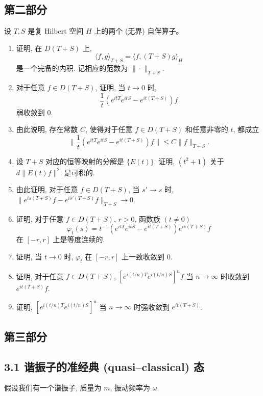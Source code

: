 \subsection*{第二部分}

设 $T, S$ 是复 Hilbert 空间 $H$ 上的两个 (无界) 自伴算子。

\begin{enumerate}
    \item 证明, 在 $D(T + S)$ 上, \[\langle f, g \rangle_{T+S} 
    = \langle f, (T + S)g \rangle_H\] 是一个完备的内积. 
    记相应的范数为 $\| \cdot \|_{T+S}$.
    \item 对于任意 $f \in D(T + S)$, 证明, 当 $t \to 0$ 时, 
    \[\frac{1}{t} (e^{itT} e^{itS} - e^{it(T+S)}) f\] 弱收敛到 $0$.
    \item 由此说明, 存在常数 $C$, 使得对于任意 $f \in D(T + S)$ 和任意非零的 $t$, 都成立 
    \[\|\frac{1}{t} (e^{itT} e^{itS} - e^{it(T+S)}) f \| \leqslant C \| f \|_{T+S}.\]
    \item 设 $T + S$ 对应的恒等映射的分解是 $\{E(t)\}$. 
    证明, $(t^2 + 1)$ 关于 $d\|E(t) f \|^2$ 是可积的.
    \item 由此证明, 对于任意 $f \in D(T+S)$, 当 $s' \to s$ 时, 
    $\| e^{is(T+S)} f - e^{is'(T+S)} f \|_{T+S} \to 0$.
    \item 证明, 对于任意 $f \in D(T + S)$, $r > 0$, 函数族 $(t \neq 0)$ 
    \[\varphi_t(s) = t^{-1}(e^{itT} e^{itS} - e^{it(T+S)}) e^{is(T+S)} f\]
    在 $[-r, r]$ 上是等度连续的.
    \item 证明, 当 $t \to 0$ 时, $\varphi_t$ 在 $[-r, r]$ 上一致收敛到 $0$.
    \item 证明, 对于任意 $f \in D(T+S)$, $[e^{i(t/n)T} e^{i(t/n)S}]^n f$ 
    当 $n \to \infty$ 时收敛到 $e^{it(T+S)} f$.
    \item 证明, $[e^{i(t/n)T} e^{i(t/n)S}]^n$ 当 $n \to \infty$ 时强收敛到 $e^{it(T+S)}$.
\end{enumerate}

\subsection*{第三部分}

\subsection*{3.1 谐振子的准经典 (quasi--classical) 态}

假设我们有一个谐振子, 质量为 $m$, 振动频率为 $\omega$.

